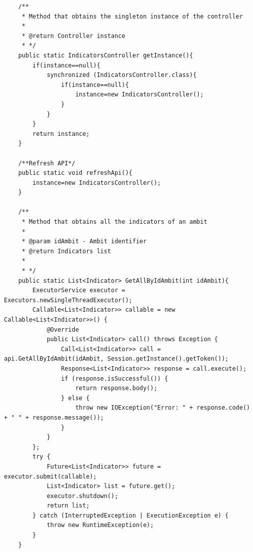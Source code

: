 \begin{itemize}
\begin{itemize}
\begin{lstlisting}
    /**
     * Method that obtains the singleton instance of the controller
     *
     * @return Controller instance
     * */
    public static IndicatorsController getInstance(){
        if(instance==null){
            synchronized (IndicatorsController.class){
                if(instance==null){
                    instance=new IndicatorsController();
                }
            }
        }
        return instance;
    }

    /**Refresh API*/
    public static void refreshApi(){
        instance=new IndicatorsController();
    }

    /**
     * Method that obtains all the indicators of an ambit
     *
     * @param idAmbit - Ambit identifier
     * @return Indicators list
     *
     * */
    public static List<Indicator> GetAllByIdAmbit(int idAmbit){
        ExecutorService executor = Executors.newSingleThreadExecutor();
        Callable<List<Indicator>> callable = new Callable<List<Indicator>>() {
            @Override
            public List<Indicator> call() throws Exception {
                Call<List<Indicator>> call = api.GetAllByIdAmbit(idAmbit, Session.getInstance().getToken());
                Response<List<Indicator>> response = call.execute();
                if (response.isSuccessful()) {
                    return response.body();
                } else {
                    throw new IOException("Error: " + response.code() + " " + response.message());
                }
            }
        };
        try {
            Future<List<Indicator>> future = executor.submit(callable);
            List<Indicator> list = future.get();
            executor.shutdown();
            return list;
        } catch (InterruptedException | ExecutionException e) {
            throw new RuntimeException(e);
        }
    }



\end{lstlisting}
\end{itemize}
\end{itemize}
